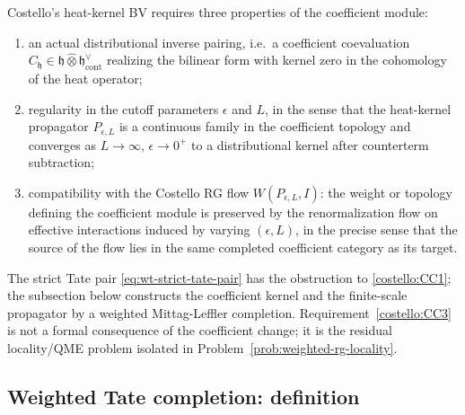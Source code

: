 \begin{rmk}
  Costello's heat-kernel BV requires three properties of the
  coefficient module:
  \begin{enumerate}[label=(C\arabic*)]
    \item\label{costello:CC1} an actual distributional inverse pairing,
      i.e.\ a coefficient coevaluation
      $C_{\mathfrak h}\in\mathfrak h\widehat\otimes
      \mathfrak h^\vee_{\mathrm{cont}}$ realizing the bilinear form
      with kernel zero in the cohomology of the heat operator;
    \item\label{costello:CC2} regularity in the cutoff parameters
      $\epsilon$ and $L$, in the sense that the heat-kernel
      propagator $P_{\epsilon,L}$ is a continuous family in the
      coefficient topology and converges as
      $L\to\infty$, $\epsilon\to0^+$ to a distributional kernel after
      counterterm subtraction;
    \item\label{costello:CC3} compatibility with the Costello RG flow
      $W(P_{\epsilon,L},I)$: the weight or topology defining the
      coefficient module is preserved by the renormalization flow on
      effective interactions induced by varying $(\epsilon,L)$, in the
      precise sense that the source of the flow lies in the same
      completed coefficient category as its target.
  \end{enumerate}
  The strict Tate pair \eqref{eq:wt-strict-tate-pair} has the
  obstruction to \ref{costello:CC1}; the subsection below constructs the
  coefficient kernel and the finite-scale propagator by a weighted
  Mittag-Leffler completion.  Requirement~\ref{costello:CC3} is not a
  formal consequence of the coefficient change; it is the residual
  locality/QME problem isolated in
  Problem~\ref{prob:weighted-rg-locality}.
\end{rmk}

\subsection*{Weighted Tate completion: definition}


